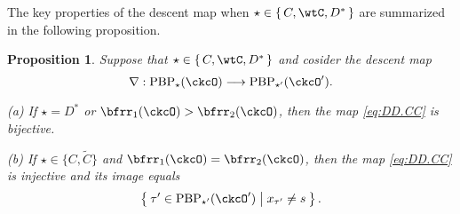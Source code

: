 \documentclass[12pt,a4paper]{amsart}
\numberwithin{equation}{section}
\newtheorem{prop}[thm]{Proposition}
\theoremstyle{remark}
\def\ckcOp{\ckcO^{\prime}}
\def\PBP{\mathrm{PBP}}
\begin{document}


The key properties of the descent map when $\star\in \set{C,\wtC,D^*}$ are summarized in the following proposition.

\begin{prop}\label{lem:DD.bij}
Suppose that $\star \in \set{C,\wtC,D^*}$ and cosider the
descent map
\begin{equation}\label{eq:DD.CC}
\nabla: \PBP_\star(\ckcO)\longrightarrow  \PBP_{\star'}(\ckcOp).
\end{equation}

\noindent (a) If
$\star=D^*$ or $\bfrr_1(\ckcO)>\bfrr_2(\ckcO)$, then
the map \eqref{eq:DD.CC}  is bijective.

 \noindent (b) If  $\star\in \{C,\widetilde C\}$ and $\bfrr_1(\ckcO)=\bfrr_2(\ckcO)$, then the  map \eqref{eq:DD.CC} is injective and its image equals
\[
\Set{\tau'\in \PBP_{\star'}(\ckcOp)| x_{\tau'}\neq s}.
\]

\end{prop}
\end{document}
